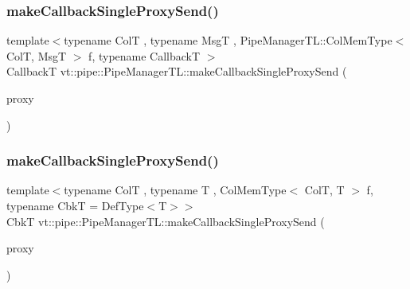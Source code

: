 \subsubsection{\texorpdfstring{make\+Callback\+Single\+Proxy\+Send()}{makeCallbackSingleProxySend()}\hspace{0.1cm}{\footnotesize\ttfamily [2/3]}}
{\footnotesize\ttfamily template$<$typename ColT , typename MsgT , Pipe\+Manager\+T\+L\+::\+Col\+Mem\+Type$<$ Col\+T, Msg\+T $>$ f, typename CallbackT $>$ \\
CallbackT vt\+::pipe\+::\+Pipe\+Manager\+T\+L\+::make\+Callback\+Single\+Proxy\+Send (\begin{DoxyParamCaption}\item[{typename Col\+T\+::\+Proxy\+Type}]{proxy }\end{DoxyParamCaption})}

\mbox{\label{structvt_1_1pipe_1_1_pipe_manager_t_l_a2c8c3a5aca22b2526fe68dd543a8a888}} 
\subsubsection{\texorpdfstring{make\+Callback\+Single\+Proxy\+Send()}{makeCallbackSingleProxySend()}\hspace{0.1cm}{\footnotesize\ttfamily [3/3]}}
{\footnotesize\ttfamily template$<$typename ColT , typename T , Col\+Mem\+Type$<$ Col\+T, T $>$ f, typename CbkT  = Def\+Type$<$\+T$>$$>$ \\
CbkT vt\+::pipe\+::\+Pipe\+Manager\+T\+L\+::make\+Callback\+Single\+Proxy\+Send (\begin{DoxyParamCaption}\item[{typename Col\+T\+::\+Proxy\+Type}]{proxy }\end{DoxyParamCaption})}

\mbox{\label{structvt_1_1pipe_1_1_pipe_manager_t_l_a8776a3e14cce177c3b31aed347177750}} 
